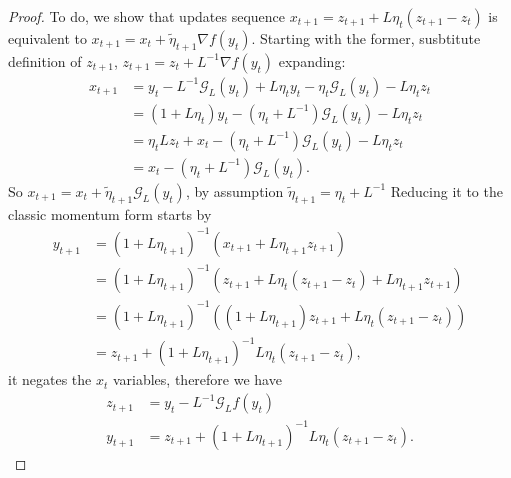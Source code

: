 \documentclass[12pt]{article}
\begin{document}
            \begin{proof}
                To do, we show that updates sequence $x_{t + 1} = z_{t + 1} + L\eta_t (z_{t + 1} - z_t)$ is equivalent to $x_{t + 1} = x_t + \tilde\eta_{t + 1}\nabla f(y_t)$. 
                Starting with the former, susbtitute definition of $z_{t + 1}$, $z_{t + 1} = z_t + L^{-1}\nabla f(y_t)$ expanding: 
                \begin{align*}
                    x_{t + 1} &= y_t - L^{-1}\mathcal G_L(y_t) 
                    + L \eta_t y_t - \eta_t \mathcal G_L(y_t) - L\eta_t z_t
                    \\
                    &= 
                    (1 + L\eta_t)y_t - (\eta_t + L^{-1})\mathcal G_L(y_t) - L\eta_t z_t
                    \\
                    &= \eta_t Lz_t + x_t -(\eta_t + L^{-1}) \mathcal G_L(y_t)  - L\eta_t z_t
                    \\
                    &= x_t - (\eta_t + L^{-1})\mathcal G_L(y_t). 
                \end{align*}
                So $x_{t + 1} = x_t + \tilde \eta_{t + 1}\mathcal G_L(y_t)$, by assumption $\tilde \eta_{t + 1} = \eta_t + L^{-1}$
                Reducing it to the classic momentum form starts by 
                \begin{align*}
                    y_{t + 1} &= (1 + L\eta_{t + 1})^{-1} (x_{t + 1} + L\eta_{t + 1}z_{t + 1})
                    \\
                    &= (1 + L\eta_{t + 1})^{-1} (
                        z_{t + 1} + L\eta_t (z_{t + 1} - z_t) + L\eta_{t + 1} z_{t + 1}
                    )
                    \\
                    &= 
                    (1 + L\eta_{t + 1})^{-1} (
                        (1 + L\eta_{t + 1})z_{t + 1} + L\eta_t(z_{t + 1} - z_t)
                    )
                    \\
                    &= z_{t + 1} + (1 + L\eta_{t + 1})^{-1}L\eta_t (z_{t + 1} - z_t), 
                \end{align*}
                it negates the $x_t$ variables, therefore we have 
                \begin{align*}
                    z_{t + 1} &= y_t - L^{-1} \mathcal G_L f(y_t)
                    \\
                    y_{t + 1} &= z_{t + 1} + (1 + L\eta_{t + 1})^{-1}L\eta_t (z_{t + 1} - z_t).
                \end{align*}
            \end{proof}
\end{document}
